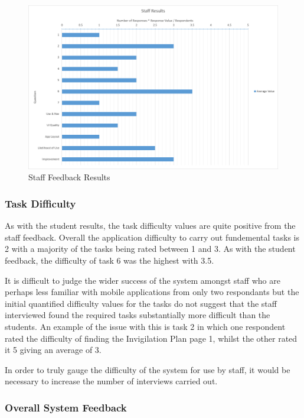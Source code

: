 \begin{figure}[!htbp]
	\centering
	\includegraphics[width=\textwidth]{"evaluation/graphs/staff_responses"}
	\caption{Staff Feedback Results}
	\label{fig:staff_responses}
\end{figure}

\FloatBarrier

\subsubsection{Task Difficulty}

As with the student results, the task difficulty values are quite positive from the staff feedback.  Overall the application difficulty to carry out fundemental tasks is 2 with a majority of the tasks being rated between 1 and 3.  As with the student feedback, the difficulty of task 6 was the highest with 3.5.

It is difficult to judge the wider success of the system amongst staff who are perhaps less familiar with mobile applications from only two respondants but the initial quantified difficulty values for the tasks do not suggest that the staff interviewed found the required tasks substantially more difficult than the students.  An example of the issue with this is task 2 in which one respondent rated the difficulty of finding the Invigilation Plan page 1, whilst the other rated it 5 giving an average of 3.

In order to truly gauge the difficulty of the system for use by staff, it would be necessary to increase the number of interviews carried out.

\subsubsection{Overall System Feedback}

